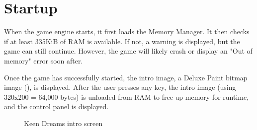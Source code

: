 \documentclass[book.tex]{subfiles}
\begin{document}
\section{Startup}
When the game engine starts, it first loads the Memory Manager. It then checks if at least 335KiB of RAM is available. If not, a warning is displayed, but the game can still continue. However, the game will likely crash or display an "Out of memory" error soon after. \\

\par
Once the game has successfully started, the intro image, a Deluxe Paint bitmap image (), is displayed. After the user presses any key, the intro image (using 320x200 = 64,000 bytes) is unloaded from RAM to free up memory for runtime, and the control panel is displayed.\\

\begin{figure}[H]
\centering
{}
\caption{Keen Dreams intro screen}
\end{figure}
\pagebreak
\end{document}
